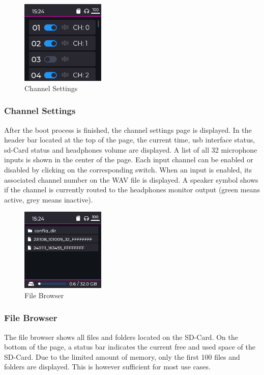 \begin{minipage}{\linewidth}
	\begin{figure}
		\vspace{-0.6cm}
		\includegraphics[width=4cm]{images/4_design_acquisition_system/gui/03_channel_settings.png}
		\centering
		\caption{Channel Settings}
		\label{fig:acquisition_system_gui_channel_settings}
	\end{figure}
	\subsubsection{Channel Settings}
	After the boot process is finished, the channel settings page is displayed.
	In the header bar located at the top of the page, the current time, \acrshort{usb} interface status, \acrshort{sd}-Card status and headphones volume are displayed.
	A list of all 32 microphone inputs is shown in the center of the page.
	Each input channel can be enabled or disabled by clicking on the corresponding switch.
	When an input is enabled, its associated channel number on the WAV file is displayed.
	A speaker symbol shows if the channel is currently routed to the headphones monitor output (green means active, grey means inactive).
\end{minipage}
\newpage

\begin{minipage}{\linewidth}
	\begin{figure}
		\vspace{-0.6cm}
		\includegraphics[width=4cm]{images/4_design_acquisition_system/gui/02_file_browser.png}
		\centering
		\caption{File Browser}
		\label{fig:acquisition_system_gui_file_browser}
	\end{figure}
	\subsubsection{File Browser}
	The file browser shows all files and folders located on the SD-Card.
	On the bottom of the page, a status bar indicates the current free and used space of the SD-Card.
	Due to the limited amount of memory, only the first 100 files and folders are displayed.
	This is however sufficient for most use cases.
\end{minipage}
\vspace{1.2cm}

